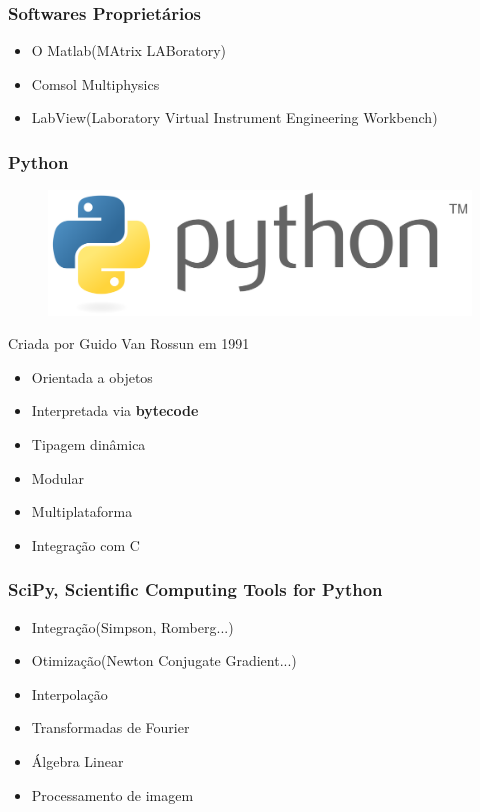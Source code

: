 \documentclass{beamer}
\begin{document}
\begin{frame}

    \frametitle{Softwares Proprietários}
    \begin{itemize}
    \item O Matlab(MAtrix LABoratory)
    \item Comsol Multiphysics
    \item LabView(Laboratory Virtual Instrument Engineering Workbench)
    \end{itemize}
\end{frame}

\begin{frame}
    \frametitle{Python}
    \begin{figure}
        \includegraphics[width=.3\linewidth]{pylogo.png}
    \end{figure}   
    Criada por Guido Van Rossun em 1991
    \begin{itemize}
        \item Orientada a objetos
        \item Interpretada via \textbf{bytecode}
        \item Tipagem dinâmica
        \item Modular
        \item Multiplataforma
        \item Integração com C
    \end{itemize}
\end{frame}

\begin{frame}
    \frametitle{SciPy, Scientific Computing Tools for Python}
    \begin{itemize}
        \item Integração(Simpson, Romberg...)
        \item Otimização(Newton Conjugate Gradient...)
        \item Interpolação
        \item Transformadas de Fourier
        \item Álgebra Linear
        \item Processamento de imagem
    \end{itemize}
\end{frame}
\end{document}
